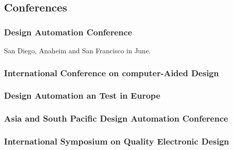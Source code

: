\documentclass[12pt,a4paper]{article}
\theoremstyle{customdef}
\begin{document}
\subsection{Conferences}
\subsubsection{Design Automation Conference}
San Diego, Anaheim and San Francisco in June.
\subsubsection{International Conference on computer-Aided Design}
\subsubsection{Design Automation an Test in Europe}
\subsubsection{Asia and South Pacific Design Automation Conference}
\subsubsection{International Symposium on Quality Electronic Design}



\newpage

\glsaddall
\printglossaries

\newpage

% 

\end{document}
